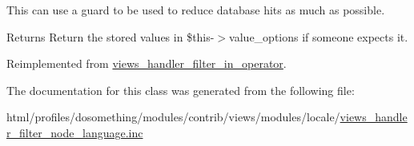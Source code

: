 This can use a guard to be used to reduce database hits as much as possible.

\begin{DoxyReturn}{Returns}
Return the stored values in \$this-\/$>$value\_\-options if someone expects it. 
\end{DoxyReturn}


Reimplemented from \hyperlink{classviews__handler__filter__in__operator_aa5b5df6d90f4359ed28c0c446bdc81a6}{views\_\-handler\_\-filter\_\-in\_\-operator}.

The documentation for this class was generated from the following file:\begin{DoxyCompactItemize}
\item 
html/profiles/dosomething/modules/contrib/views/modules/locale/\hyperlink{views__handler__filter__node__language_8inc}{views\_\-handler\_\-filter\_\-node\_\-language.inc}\end{DoxyCompactItemize}

